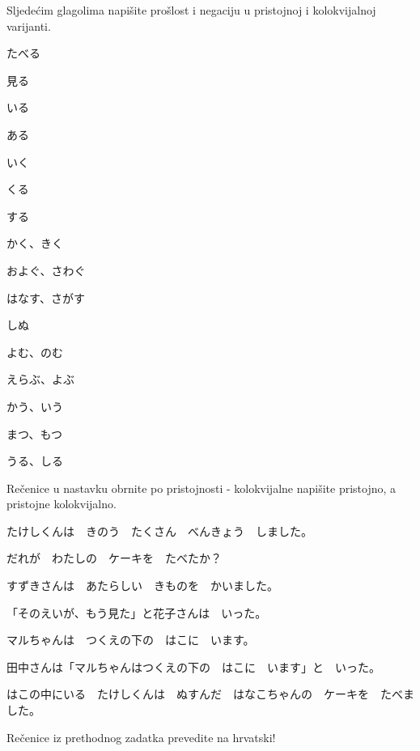 
\author{Tomislav Mamić}

	
	\begin{mondai}{Sljedećim glagolima napišite prošlost i negaciju u pristojnoj i kolokvijalnoj varijanti.}
		\item たべる
		\item 見る
		\item いる
		\vspace{5pt}
		\item ある
		\item いく
		\item くる
		\item する
		\vspace{5pt}
		\item かく、きく
		\item およぐ、さわぐ
		\item はなす、さがす
		\vspace{5pt}
		\item しぬ
		\item よむ、のむ
		\item えらぶ、よぶ
		\vspace{5pt}
		\item かう、いう
		\item まつ、もつ
		\item うる、しる
	\end{mondai}

	\begin{mondai}{Rečenice u nastavku obrnite po pristojnosti - kolokvijalne napišite pristojno, a pristojne kolokvijalno.}
		\item たけしくんは　きのう　たくさん　べんきょう　しました。
		\item だれが　わたしの　ケーキを　たべたか？
		\item すずきさんは　あたらしい　きものを　かいました。
		\item 「そのえいが、もう見た」と花子さんは　いった。
		\item マルちゃんは　つくえの下の　はこに　います。
		\item 田中さんは「マルちゃんはつくえの下の　はこに　います」と　いった。
		\item *はこの中にいる　たけしくんは　ぬすんだ　はなこちゃんの　ケーキを　たべました。
	\end{mondai}

	\noindent Rečenice iz prethodnog zadatka prevedite na hrvatski!
